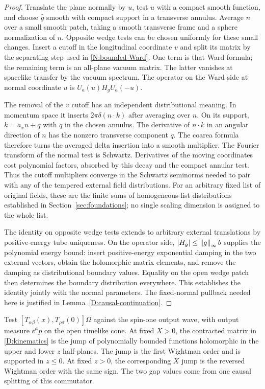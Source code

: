 \begin{proof}
Translate the plane normally by $u$, test $u$ with a compact smooth
function, and choose $\widehat g$ smooth with compact support in a
transverse annulus.  Average $n$ over a small smooth patch, taking a
smooth transverse frame and a sphere normalization of $n$.  Opposite
wedge tests can be chosen uniformly for these small changes.  Insert
a cutoff in the longitudinal coordinate $v$ and split its matrix by
the separating step used in \eqref{N:bounded-Ward}.  One term is that
Ward formula; the remaining term is an all-plane vacuum matrix.
The latter vanishes at spacelike transfer by the vacuum spectrum.
The operator on the Ward side at normal coordinate $u$ is
$U_a(u)H_gU_a(-u)$.

The removal of the $v$ cutoff has an independent distributional
meaning.  In momentum space it inserts $2\pi\delta(n\cdot k)$ after
averaging over $n$. On its support, $k=a_xn+q$ with $q$ in the
chosen annulus.  The derivative of $n\cdot k$ in an angular direction
of $n$ has the nonzero transverse component $q$.  The coarea formula
therefore turns the averaged delta insertion into a smooth multiplier.
The Fourier transform of the normal test is Schwartz.  Derivatives of
the moving coordinates cost polynomial factors, absorbed by this
decay and the compact annular test.  Thus the cutoff multipliers
converge in the Schwartz seminorms needed to pair with any of the
tempered external field distributions.  For an arbitrary fixed list
of original fields, these are the finite sums of homogeneous-list
distributions established in Section~\ref{sec:foundations}; no single
scaling dimension is assigned to the whole list.

The identity on opposite wedge tests extends to arbitrary external
translations by positive-energy tube uniqueness.  On the operator
side, $|H_g|\leq\left\lVert g\right\rVert_\infty b$ supplies the polynomial energy
bound: insert positive-energy exponential damping in the two
external vectors, obtain the holomorphic matrix elements, and remove
the damping as distributional boundary values.  Equality on the open
wedge patch then determines the boundary distribution everywhere.
This establishes the identity jointly with the normal parameters.
The fixed-normal pullback needed here is justified in
Lemma~\ref{D:causal-continuation}.
\end{proof}

\begin{lemma}
\label{D:causal-continuation}
Test $[T_{\alpha\beta}(x),T_{\rho\sigma}(0)]\Omega$ against the
spin-one output wave, with output measure $\dd^4p$ on the open
timelike cone.  At fixed $X>0$, the contracted matrix in
\eqref{D:kinematics} is the jump of polynomially bounded functions
holomorphic in the upper and lower $z$ half-planes.  The jump is the
first Wightman order and is supported in $z\leq0$.
At fixed $z>0$, the corresponding $X$ jump is the reversed Wightman
order with the same sign.  The two gap values come from one causal
splitting of this commutator.
\end{lemma}

